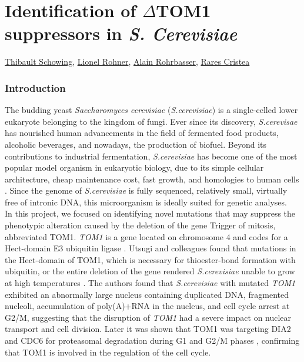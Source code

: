 \documentclass[10pt,a4paper]{article}
\begin{document}
\newpage
\part*{\Large Identification of $\Delta$TOM1 suppressors in \textit{S. Cerevisiae}}

\href{mailto:thibault.schowing@unifr.ch}{Thibault Schowing}, \href{mailto:lio_roh@students.unibe.ch}{Lionel Rohner},
\href{mailto:alain.rohrbasser.unifr.ch}{Alain Rohrbasser},
\href{mailto:rares.cristea@unifr.ch}{Rares Cristea}\\

\section*{\large Introduction}


The budding yeast \textit{Saccharomyces cerevisiae} (\textit{S.cerevisiae}) is a single-celled lower eukaryote belonging to the kingdom of fungi. Ever since its discovery, \textit{S.cerevisae} has nourished human advancements in the field of fermented food products, alcoholic beverages, and nowadays, the production of biofuel. Beyond its contributions to industrial fermentation, \textit{S.cerevisiae} has become one of the most popular model organism in eukaryotic biology, due to its simple cellular architecture, cheap maintenance cost, fast growth, and homologies to human cells \cite{botstein_yeast_2011}. Since the genome of \textit{S.cerevisiae} is fully sequenced, relatively small, virtually free of intronic DNA, this microorganism is ideally suited for genetic analyses.\\

\noindent In this project, we focused on identifying novel mutations that may suppress the phenotypic alteration caused by the deletion of the gene Trigger of mitosis, abbreviated TOM1. \textit{TOM1} is a gene located on chromosome 4 and codes for a Hect-domain E3 ubiquitin ligase \cite{utsugi_yeast_1999}. Utsugi and colleagues found that mutations in the Hect-domain of TOM1, which is necessary for thioester-bond formation with ubiquitin, or the entire deletion of the gene rendered \textit{S.cerevisiae} unable to grow at high temperatures \cite{utsugi_yeast_1999}. The authors found that \textit{S.cerevisiae} with mutated \textit{TOM1} exhibited an abnormally large nucleus containing duplicated DNA, fragmented nucleoli, accumulation of poly(A)+RNA in the nucleus, and cell cycle arrest at G2/M, suggesting that the disruption of \textit{TOM1} had a severe impact on nuclear transport and cell division. Later it was shown that TOM1 was targeting DIA2 and CDC6 for proteasomal degradation during G1 and G2/M phases \cite{kim_hect_2012}, confirming that TOM1 is involved in the regulation of the cell cycle.\\
\end{document}
